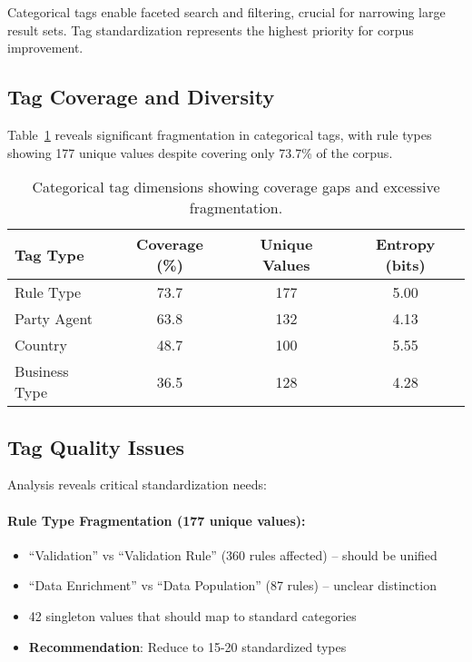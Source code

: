 Categorical tags enable faceted search and filtering, crucial for narrowing large result sets. Tag standardization represents the highest priority for corpus improvement.

\subsection{Tag Coverage and Diversity}

Table~\ref{tab:tag-coverage} reveals significant fragmentation in categorical tags, with rule types showing 177 unique values despite covering only 73.7\% of the corpus.

\begin{table}[H]
\centering
\begin{tabular}{lccc}
\toprule
\textbf{Tag Type} & \textbf{Coverage (\%)} & \textbf{Unique Values} & \textbf{Entropy (bits)} \\
\midrule
Rule Type & 73.7 & 177 & 5.00 \\
Party Agent & 63.8 & 132 & 4.13 \\
Country & 48.7 & 100 & 5.55 \\
Business Type & 36.5 & 128 & 4.28 \\
\bottomrule
\end{tabular}
\caption{Categorical tag dimensions showing coverage gaps and excessive fragmentation.}
\label{tab:tag-coverage}
\end{table}

\subsection{Tag Quality Issues}

Analysis reveals critical standardization needs:

\paragraph{Rule Type Fragmentation (177 unique values):}
\begin{itemize}[leftmargin=*,itemsep=2pt,topsep=2pt]
 \item ``Validation'' vs ``Validation Rule'' (360 rules affected) -- should be unified
 \item ``Data Enrichment'' vs ``Data Population'' (87 rules) -- unclear distinction
 \item 42 singleton values that should map to standard categories
 \item \textbf{Recommendation}: Reduce to 15-20 standardized types
\end{itemize}


